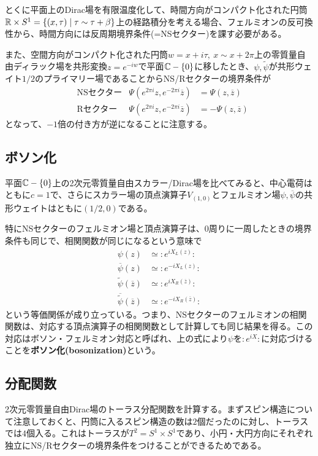 とくに平面上のDirac場を有限温度化して、時間方向がコンパクト化された円筒$\mathbb{R}\times S^1=\{(x,\tau)\mid \tau\sim \tau+\beta\}$上の経路積分を考える場合、フェルミオンの反可換性から、時間方向には反周期境界条件(=NSセクター)を課す必要がある。

また、空間方向がコンパクト化された円筒$w=x+i\tau,\ x\sim x+2\pi$上の零質量自由ディラック場を共形変換$z=e^{-iw}$で平面$\mathbb{C}-\{0\}$に移したとき、$\psi,\tilde{\psi}$が共形ウェイト$1/2$のプライマリー場であることからNS/Rセクターの境界条件が
\begin{align}
&&&\text{NSセクター}&\Psi(e^{2\pi i}z,e^{-2\pi i}\overline{z})&=\Psi(z,\overline{z})&&\\
&&&\text{Rセクター}&\Psi(e^{2\pi i}z,e^{-2\pi i}\overline{z})&=-\Psi(z,\overline{z})&&
\end{align}
となって、$-1$倍の付き方が逆になることに注意する。

\subsection{ボソン化}
平面$\mathbb{C}-\{0\}$上の2次元零質量自由スカラー/Dirac場を比べてみると、中心電荷はともに$c=1$で、さらにスカラー場の頂点演算子$V_{(1,0)}$とフェルミオン場$\psi,\overline{\psi}$の共形ウェイトはともに$(1/2,0)$である。
\begin{oframed}
特にNSセクターのフェルミオン場と頂点演算子は、$0$周りに一周したときの境界条件も同じで、相関関数が同じになるという意味で
\begin{align}
\psi(z)&\simeq \colon e^{iX_L(z)} \colon\\
\overline{\psi}(z)&\simeq \colon e^{-i X_L(z)} \colon\\
\tilde{\psi}(\overline{z})&\simeq \colon e^{iX_R(\overline{z})} \colon\\
\overline{\tilde{\psi}}(\overline{z})&\simeq \colon e^{-i X_R(\overline{z})} \colon
\end{align}
という等価関係が成り立っている。つまり、NSセクターのフェルミオンの相関関数は、対応する頂点演算子の相関関数として計算しても同じ結果を得る。この対応はボソン・フェルミオン対応と呼ばれ、上の式により$\psi$を$:e^{iX}:$に対応づけることを\textbf{ボソン化(bosonization)}という。
\end{oframed}

\subsection{分配関数}
2次元零質量自由Dirac場のトーラス分配関数を計算する。まずスピン構造について注意しておくと、円筒に入るスピン構造の数は$2$個だったのに対し、トーラスでは$4$個入る。これはトーラスが$T^2=S^1\times S^1$であり、小円・大円方向にそれぞれ独立にNS/Rセクターの境界条件をつけることができるためである。

